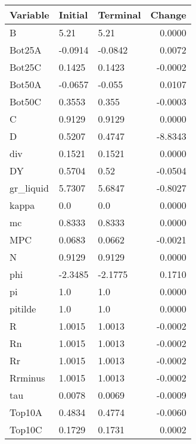 \begin{table}
\centering
\label{tab:stst_comparison_very_slow_phi_limit_permanent}
\begin{tabular}{lllr}
\toprule
                Variable & Initial & Terminal &  Change \\
\midrule
                       B &    5.21 &     5.21 &  0.0000 \\
                  Bot25A & -0.0914 &  -0.0842 &  0.0072 \\
                  Bot25C &  0.1425 &   0.1423 & -0.0002 \\
                  Bot50A & -0.0657 &   -0.055 &  0.0107 \\
                  Bot50C &  0.3553 &    0.355 & -0.0003 \\
                       C &  0.9129 &   0.9129 &  0.0000 \\
                       D &  0.5207 &   0.4747 & -8.8343 \\
                     div &  0.1521 &   0.1521 &  0.0000 \\
                      DY &  0.5704 &     0.52 & -0.0504 \\
               gr\_liquid &  5.7307 &   5.6847 & -0.8027 \\
                   kappa &     0.0 &      0.0 &  0.0000 \\
                      mc &  0.8333 &   0.8333 &  0.0000 \\
                     MPC &  0.0683 &   0.0662 & -0.0021 \\
                       N &  0.9129 &   0.9129 &  0.0000 \\
                     phi & -2.3485 &  -2.1775 &  0.1710 \\
                      pi &     1.0 &      1.0 &  0.0000 \\
                 pitilde &     1.0 &      1.0 &  0.0000 \\
                       R &  1.0015 &   1.0013 & -0.0002 \\
                      Rn &  1.0015 &   1.0013 & -0.0002 \\
                      Rr &  1.0015 &   1.0013 & -0.0002 \\
                 Rrminus &  1.0015 &   1.0013 & -0.0002 \\
                     tau &  0.0078 &   0.0069 & -0.0009 \\
                  Top10A &  0.4834 &   0.4774 & -0.0060 \\
                  Top10C &  0.1729 &   0.1731 &  0.0002 \\

\end{tabular}
\end{table}
